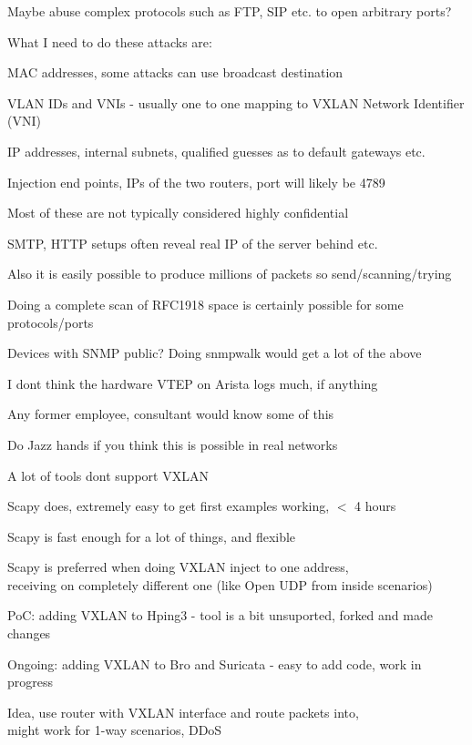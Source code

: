 \documentclass[Screen16to9,17pt,footrule]{foils}
\begin{document}
Maybe abuse complex protocols such as FTP, SIP etc. to open arbitrary ports?


What I need to do these attacks are:
\begin{list2}
\item MAC addresses, some attacks can use broadcast destination
\item VLAN IDs and VNIs - usually one to one mapping to VXLAN Network Identifier (VNI)
\item IP addresses, internal subnets, qualified guesses as to default gateways etc.
\item Injection end points, IPs of the two routers, port will likely be 4789
\item Most of these are not typically considered highly confidential
\item SMTP, HTTP setups often reveal real IP of the server behind etc.
\item Also it is easily possible to produce millions of packets so send/scanning/trying
\item Doing a complete scan of RFC1918 space is certainly possible for some protocols/ports
\item Devices with SNMP public? Doing snmpwalk would get a lot of the above
\item I dont think the hardware VTEP on Arista logs much, if anything
\end{list2}

\vskip 1cm
Any former employee, consultant would know some of this

Do Jazz hands if you think this is possible in real networks


\begin{list2}
\item A lot of tools dont support VXLAN
\item Scapy does, extremely easy to get first examples working, $<$ 4 hours
\item Scapy is fast enough for a lot of things, and flexible
\item Scapy is preferred when doing VXLAN inject to one address, \\
receiving on completely different one (like Open UDP from inside scenarios)
\item PoC: adding VXLAN to Hping3 - tool is a bit unsuported, forked and made changes
\item Ongoing: adding VXLAN to Bro and Suricata - easy to add code, work in progress
\item Idea, use router with VXLAN interface and route packets into,\\ might work for 1-way scenarios, DDoS
\end{list2}
\end{document}
